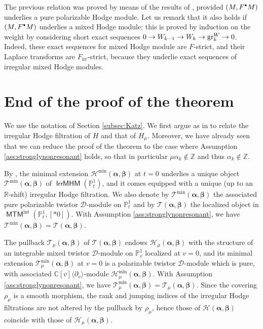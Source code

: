\documentclass[11pt]{article}
\let\mathcal\mathscr
\def\cD{\mathcal{D}}
\def\cH{\mathcal{H}}
\def\cT{\mathcal{T}}
\def\CC{\mathbb{C}}
\def\PP{\mathbb{P}}
\def\RR{\mathbb{R}}
\def\ZZ{\mathbb{Z}}
\def\alphag{\boldsymbol{\alpha}}
\def\betag{\boldsymbol{\beta}}
\newcommand{\bbullet}{{\scriptscriptstyle\bullet}}
\newcommand{\cbbullet}{{\raisebox{1pt}{$\bbullet$}}}
\newcommand{\intt}{{\mathrm{int}}}
\newcommand{\irr}{{\mathrm{irr}}}
\DeclareMathOperator{\gr}{gr}
\DeclareMathOperator{\IrrMHM}{\mathsf{IrrMHM}}
\DeclareMathOperator{\MTM}{\mathsf{MTM}}
\def\to{\mathchoice{\longrightarrow}{\rightarrow}{\rightarrow}{\rightarrow}}
\begin{document}
The previous relation was proved by means of the results of \cite{Bibi05b,Bibi08}, provided $(M,F^\cbbullet M)$ underlies a pure polarizable Hodge module. Let us remark that it also holds if $(M,F^\cbbullet M)$ underlies a mixed Hodge module: this is proved by induction on the weight by considering short exact sequences $0\to W_{k-1}\to W_k\to\gr_k^W\to0$. Indeed, these exact sequences for mixed Hodge module are $F$-strict, and their Laplace transforms are $F_\irr$\nobreakdash-strict, because they underlie exact sequences of irregular mixed Hodge modules.

\section{End of the proof of the theorem}
We use the notation of Section \ref{subsec:Katz}. We first argue as in \cite[\S3.2.c]{Bibi15} to relate the irregular Hodge filtration of $H$ and that of $H_\mu$. Moreover, we have already seen that we can reduce the proof of the theorem to the case where Assumption \eqref{ass:stronglynonresonant} holds, so that in particular $\mu\alpha_k\notin\ZZ$ and thus $\alpha_k\notin\ZZ$.

By \cite[Th.\,0.7]{Bibi15}, the minimal extension $\cH^{\min}(\alphag,\betag)$ at $t=0$ underlies a unique object $\cT^{\min}(\alphag,\betag)$ of $\IrrMHM(\PP^1_t)$, and it comes equipped with a unique (up to an $\RR$-shift) irregular Hodge filtration. We also denote by $\cT^{\min}(\alphag,\betag)$ the associated pure polarizable twistor $\cD$-module on $\PP^1_t$ and by $\cT(\alphag,\betag)$ the localized object in $\MTM^\intt(\PP^1_t,[*0])$. With Assumption \eqref{ass:stronglynonresonant}, we have $\cT^{\min}(\alphag,\betag)=\cT(\alphag,\betag)$.

The pullback $\cT_\mu(\alphag, \betag)$ of $\cT(\alphag, \betag)$ endows $\cH_\mu(\alphag, \betag)$ with the structure of an integrable mixed twistor $\cD$-module on $\PP^1_v$ localized at $v=0$, and its minimal extension $\cT_\mu^{\min}(\alphag, \betag)$ at $v=0$ is a polarizable twistor $\cD$-module which is pure, with associated $\CC[v]\langle\partial_v\rangle$-module $\cH_\mu^{\min}(\alphag, \betag)$. With Assumption \eqref{ass:stronglynonresonant}, we have $\cT_\mu^{\min}(\alphag,\betag)=\cT_\mu(\alphag,\betag)$. Since the covering $\rho_\mu$ is a smooth morphism, the rank and jumping indices of the irregular Hodge filtrations are not altered by the pullback by $\rho_\mu$, hence those of $\cH(\alphag,\betag)$ coincide with those of $\cH_\mu(\alphag,\betag)$.
\end{document}
